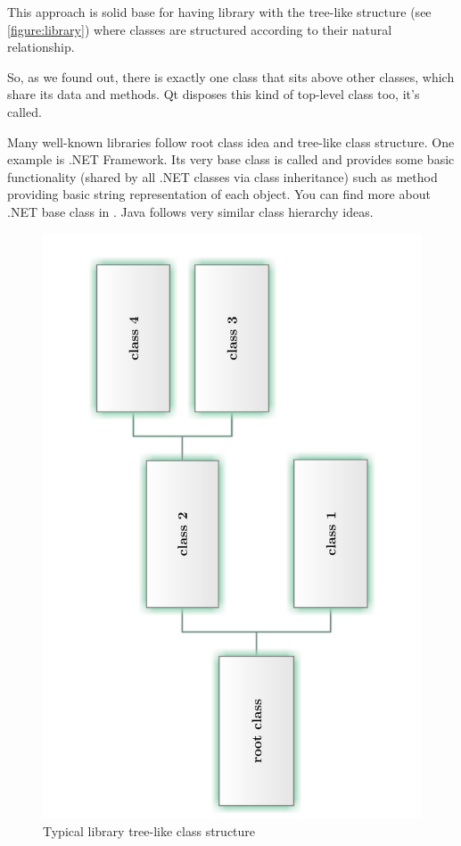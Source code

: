 This approach is solid base for having library with the tree-like structure (see \autoref{figure:library}) where classes are structured according to their natural relationship.

So, as we found out, there is exactly one class that sits above other classes, which share its data and methods. Qt disposes this kind of top-level class too, it's called.

\vfill

\begin{fdocextra}
Many well-known libraries follow root class idea and tree-like class structure. One example is .NET Framework. Its very base class is called and provides some basic functionality (shared by all .NET classes via class inheritance) such as method providing basic string representation of each object. You can find more about .NET base class in \citep[p.~84]{nigel:csharp}. Java follows very similar class hierarchy ideas.
\end{fdocextra}

\begin{figure}[ht]
\centering
\includegraphics[angle=-90,width=14cm]{graphics/laboratory/02-tree.pdf}
\caption{Typical library tree-like class structure}\label{figure:library}
\end{figure}